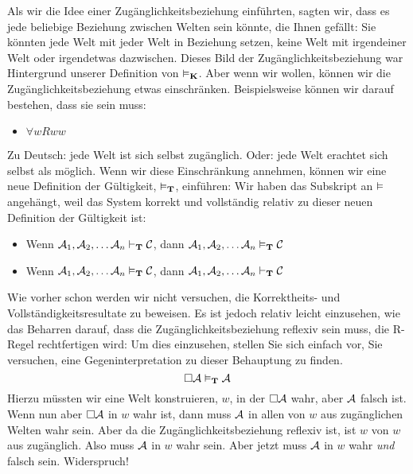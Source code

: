 Als wir die Idee einer Zugänglichkeitsbeziehung einführten, sagten wir, dass es jede beliebige Beziehung zwischen Welten sein könnte, die Ihnen gefällt: Sie könnten jede Welt mit jeder Welt in Beziehung setzen, keine Welt mit irgendeiner Welt oder irgendetwas dazwischen. Dieses Bild der Zugänglichkeitsbeziehung war Hintergrund unserer Definition von $\vDash_{\mathbf{K}}$. Aber wenn wir wollen, können wir die Zugänglichkeitsbeziehung etwas einschränken. Beispielsweise können wir darauf bestehen, dass sie  sein muss:
\begin{itemize}
	\item $\forall wRww$
\end{itemize}
Zu Deutsch: jede Welt ist sich selbst zugänglich. Oder: jede Welt erachtet sich selbst als möglich. Wenn wir diese Einschränkung annehmen, können wir eine neue Definition der Gültigkeit, $\vDash_{\mathbf{T}}$, einführen:
Wir haben das \mlT{} Subskript an $\vDash$ angehängt, weil das System \mlT{} korrekt und vollständig relativ zu dieser neuen Definition der Gültigkeit ist:
\begin{itemize}
	\item Wenn $\mathcal{A}_1,\mathcal{A}_2, \dots \mathcal{A}_n\vdash_{\mathbf{T}}\mathcal{C}$, dann $\mathcal{A}_1,\mathcal{A}_2, \dots \mathcal{A}_n\vDash_{\mathbf{T}}\mathcal{C}$
	\item Wenn $\mathcal{A}_1,\mathcal{A}_2, \dots \mathcal{A}_n\vDash_{\mathbf{T}}\mathcal{C}$, dann $\mathcal{A}_1,\mathcal{A}_2, \dots \mathcal{A}_n\vdash_{\mathbf{T}}\mathcal{C}$
\end{itemize}
Wie vorher schon werden wir nicht versuchen, die Korrektheits- und Vollständigkeitsresultate zu beweisen. Es ist jedoch relativ leicht einzusehen, wie das Beharren darauf, dass die Zugänglichkeitsbeziehung reflexiv sein muss, die R\mlT{}-Regel rechtfertigen wird:
Um dies einzusehen, stellen Sie sich einfach vor, Sie versuchen, eine Gegeninterpretation zu dieser Behauptung zu finden.
\[
	\Box \mathcal{A}\vDash_{\mathbf{T}} \mathcal{A}
\]
Hierzu müssten wir eine Welt konstruieren, $w$, in der $\Box \mathcal{A}$ wahr, aber $\mathcal{A}$ falsch ist. Wenn nun aber $\Box \mathcal{A}$ in $w$ wahr ist, dann muss $\mathcal{A}$ in allen von $w$ aus zugänglichen Welten wahr sein. Aber da die Zugänglichkeitsbeziehung reflexiv ist, ist $w$ von $w$ aus zugänglich. Also muss $\mathcal{A}$ in $w$ wahr sein. Aber jetzt muss $\mathcal{A}$ in $w$ wahr \emph{und} falsch sein. Widerspruch!

